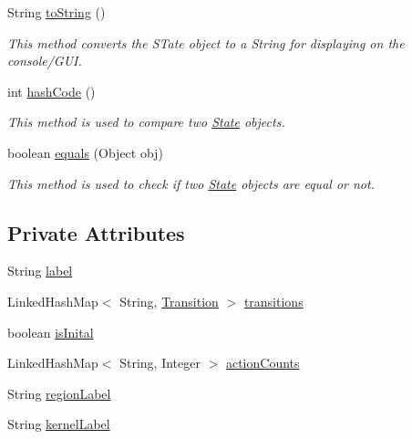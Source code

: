 \begin{DoxyCompactItemize}
String \hyperlink{classese_1_1seas_1_1upenn_1_1edu_1_1_state_a1724aba4281e960ec3be7d2d6848e5c0}{to\+String} ()
\begin{DoxyCompactList}\small\item\em This method converts the S\+Tate object to a String for displaying on the console/\+G\+U\+I. \end{DoxyCompactList}\item 
int \hyperlink{classese_1_1seas_1_1upenn_1_1edu_1_1_state_acf160eec0ee396407b972335c26196e3}{hash\+Code} ()
\begin{DoxyCompactList}\small\item\em This method is used to compare two \hyperlink{classese_1_1seas_1_1upenn_1_1edu_1_1_state}{State} objects. \end{DoxyCompactList}\item 
boolean \hyperlink{classese_1_1seas_1_1upenn_1_1edu_1_1_state_a06e902ef5ac632718ef1742752dcc926}{equals} (Object obj)
\begin{DoxyCompactList}\small\item\em This method is used to check if two \hyperlink{classese_1_1seas_1_1upenn_1_1edu_1_1_state}{State} objects are equal or not. \end{DoxyCompactList}\end{DoxyCompactItemize}
\subsection*{Private Attributes}
\begin{DoxyCompactItemize}
\item 
String \hyperlink{classese_1_1seas_1_1upenn_1_1edu_1_1_state_a77f7c602d908f1ec56c65c00c230affd}{label}
\item 
Linked\+Hash\+Map$<$ String, \hyperlink{classese_1_1seas_1_1upenn_1_1edu_1_1_transition}{Transition} $>$ \hyperlink{classese_1_1seas_1_1upenn_1_1edu_1_1_state_aeac8f20207dd613d1b9f3524315d7ff3}{transitions}
\item 
boolean \hyperlink{classese_1_1seas_1_1upenn_1_1edu_1_1_state_aabc06e5afd914e3292820fd9fab31ceb}{is\+Inital}
\item 
Linked\+Hash\+Map$<$ String, Integer $>$ \hyperlink{classese_1_1seas_1_1upenn_1_1edu_1_1_state_a75a043358cc508325468b834586638fc}{action\+Counts}
\item 
String \hyperlink{classese_1_1seas_1_1upenn_1_1edu_1_1_state_aca85473fdbd47fcee944387b2f11b5ac}{region\+Label}
\item 
String \hyperlink{classese_1_1seas_1_1upenn_1_1edu_1_1_state_a1988575cfbba31954fdf6e531da5755b}{kernel\+Label}
\end{DoxyCompactItemize}


